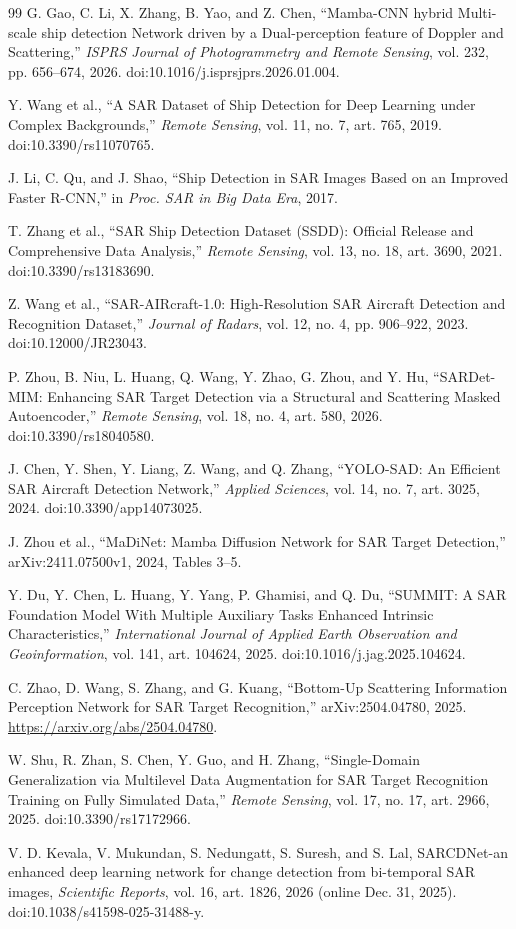 \documentclass[journal]{IEEEtran}
\begin{document}
\begin{thebibliography}{99}
G. Gao, C. Li, X. Zhang, B. Yao, and Z. Chen, ``Mamba-CNN hybrid Multi-scale ship detection Network driven by a Dual-perception feature of Doppler and Scattering,'' \emph{ISPRS Journal of Photogrammetry and Remote Sensing}, vol. 232, pp. 656--674, 2026. doi:10.1016/j.isprsjprs.2026.01.004.

Y. Wang et al., ``A SAR Dataset of Ship Detection for Deep Learning under Complex Backgrounds,'' \emph{Remote Sensing}, vol. 11, no. 7, art. 765, 2019. doi:10.3390/rs11070765.

J. Li, C. Qu, and J. Shao, ``Ship Detection in SAR Images Based on an Improved Faster R-CNN,'' in \emph{Proc. SAR in Big Data Era}, 2017.

T. Zhang et al., ``SAR Ship Detection Dataset (SSDD): Official Release and Comprehensive Data Analysis,'' \emph{Remote Sensing}, vol. 13, no. 18, art. 3690, 2021. doi:10.3390/rs13183690.

Z. Wang et al., ``SAR-AIRcraft-1.0: High-Resolution SAR Aircraft Detection and Recognition Dataset,'' \emph{Journal of Radars}, vol. 12, no. 4, pp. 906--922, 2023. doi:10.12000/JR23043.

P. Zhou, B. Niu, L. Huang, Q. Wang, Y. Zhao, G. Zhou, and Y. Hu, ``SARDet-MIM: Enhancing SAR Target Detection via a Structural and Scattering Masked Autoencoder,'' \emph{Remote Sensing}, vol. 18, no. 4, art. 580, 2026. doi:10.3390/rs18040580.

J. Chen, Y. Shen, Y. Liang, Z. Wang, and Q. Zhang, ``YOLO-SAD: An Efficient SAR Aircraft Detection Network,'' \emph{Applied Sciences}, vol. 14, no. 7, art. 3025, 2024. doi:10.3390/app14073025.

J. Zhou et al., ``MaDiNet: Mamba Diffusion Network for SAR Target Detection,'' arXiv:2411.07500v1, 2024, Tables 3--5.

Y. Du, Y. Chen, L. Huang, Y. Yang, P. Ghamisi, and Q. Du, ``SUMMIT: A SAR Foundation Model With Multiple Auxiliary Tasks Enhanced Intrinsic Characteristics,'' \emph{International Journal of Applied Earth Observation and Geoinformation}, vol. 141, art. 104624, 2025. doi:10.1016/j.jag.2025.104624.

C. Zhao, D. Wang, S. Zhang, and G. Kuang, ``Bottom-Up Scattering Information Perception Network for SAR Target Recognition,'' arXiv:2504.04780, 2025. \url{https://arxiv.org/abs/2504.04780}.

W. Shu, R. Zhan, S. Chen, Y. Guo, and H. Zhang, ``Single-Domain Generalization via Multilevel Data Augmentation for SAR Target Recognition Training on Fully Simulated Data,'' \emph{Remote Sensing}, vol. 17, no. 17, art. 2966, 2025. doi:10.3390/rs17172966.

V. D. Kevala, V. Mukundan, S. Nedungatt, S. Suresh, and S. Lal, SARCDNet-an enhanced deep learning network for change detection from bi-temporal SAR images, \emph{Scientific Reports}, vol. 16, art. 1826, 2026 (online Dec. 31, 2025). doi:10.1038/s41598-025-31488-y.
\end{thebibliography}
\end{document}
